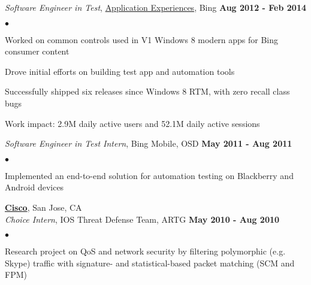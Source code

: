 \documentclass[margin,line]{res}
\newenvironment{list2}
  {\vspace{-4mm}
   \begin{list}{$\bullet$}{
     \setlength{\itemsep}{0in}
     \setlength{\parsep}{0in} \setlength{\parskip}{0in}
     \setlength{\topsep}{0in} \setlength{\partopsep}{0in}
     \setlength{\leftmargin}{0.18in}}}
  {\end{list}}
\begin{document}
\begin{resume}
{\em Software Engineer in Test}, \href{http://www.zdnet.com/microsofts-latest-search-share-attack-plan-focus-on-mobile-apps-7000008908/}{Application Experiences},
Bing                                                                                 \hfill {\bf Aug 2012 - Feb 2014} \\
\begin{list2}
\item Worked on common controls used in V1 Windows 8 modern apps for Bing consumer content %
\item Drove initial efforts on building test app and automation tools
\item Successfully shipped six releases since Windows 8 RTM, with zero recall class bugs
\item Work impact: 2.9M daily active users and 52.1M daily active sessions
\end{list2}

{\em Software Engineer in Test Intern}, Bing Mobile, OSD          \hfill {\bf May 2011 - Aug 2011} \\
\begin{list2}
\item Implemented an end-to-end solution for automation testing on Blackberry and Android devices 
\end{list2}

{\bf \href{http://cisco.com}{Cisco}}, San Jose, CA \\
{\em Choice Intern}, IOS Threat Defense Team, ARTG                \hfill {\bf May 2010 - Aug 2010}\\
\begin{list2}
\item Research project on QoS and network security by filtering polymorphic (e.g. Skype) traffic with signature- and statistical-based packet matching (SCM and FPM)
\end{list2}


\end{resume}
\end{document}

